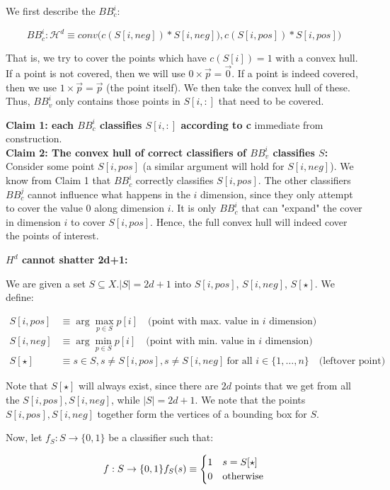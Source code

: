 \documentclass[11pt]{article}
\renewcommand{\H}{\ensuremath{\mathcal{H}}}
\begin{document}
We first describe the $BB_c^i$:

$$
BB_c^i : \H^d \equiv conv\bigg(c(S[i, neg]) * S[i, neg]), c(S[i, pos]) * S[i, pos]\bigg) 
$$

That is, we try to cover the points which have $c(S[i]) = 1$ with a
convex hull. If a point is
not covered, then we will use $0 \times \vec p = \vec 0$. If a point is
indeed covered, then we use $1 \times \vec p = \vec p$ (the point itself). We then
take the convex hull of these. Thus, $BB_v^i$ only contains those
points in $S[i, :]$ that need to be covered.

\textbf{Claim 1: each $BB_c^i$ classifies $S[i, :]$ according to c} immediate from construction. \\
\textbf{Claim 2: The convex hull of correct classifiers of $BB_v^i$ classifies $S$:}
Consider some point $S[i, pos]$ (a similar argument will hold for $S[i, neg]$).
We know from Claim 1 that $BB_c^i$ correctly classifies $S[i, pos]$. The
other classifiers $BB_c^j$ cannot influence what happens in the $i$ dimension,
since they only attempt to cover the value $0$ along dimension $i$.
It is only $BB_c^i$ that can "expand" the cover in dimension $i$ to cover
$S[i, pos]$. Hence, the full convex hull will indeed cover the points of
interest.


\textbf{$H^d$ cannot shatter 2d+1:}

We are given a set $S \subseteq X$.$|S| = 2d+1$ into $S[i, pos]$,
$S[i, neg]$, $S[\star]$. We define:

\begin{align*}
S[i, pos] &\equiv \arg \max_{p \in S} p[i] \quad \text{(point with max. value in $i$ dimension)}\\
S[i, neg] &\equiv \arg \min_{p \in S} p[i] \quad \text{(point with min. value in $i$ dimension)}\\
S[\star]  &\equiv s \in S, s \neq S[i, pos], s \neq S[i, neg]~\text{for all $i \in \{1, \dots, n\}$} \quad \text{(leftover point)}
\end{align*}

Note that $S[\star]$ will always exist, since there are $2d$ points that we get
from all the $S[i, pos], S[i, neg]$, while $|S| = 2d+1$.  We note that
the points $S[i, pos], S[i, neg]$ together form the vertices of a bounding
box for $S$.

Now, let $f_S: S \rightarrow \{0, 1\}$ be a classifier such that:

$$
f: S \rightarrow \{0, 1\} \\
f_S(s) \equiv
\begin{cases}
1 & s = S[\star] \\
0 & \text{otherwise}
\end{cases}
$$
\end{document}
